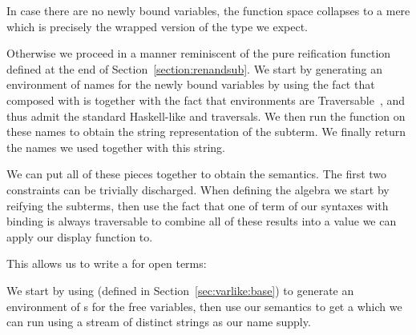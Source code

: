 \begin{agdasnippet}
\end{agdasnippet}

In case there are no newly bound variables, the  function space
collapses to a mere  which is precisely the wrapped version of
the type we expect.

\begin{agdasnippet}
\end{agdasnippet}

Otherwise we proceed in a manner reminiscent of the pure reification function
defined at the end of Section~\ref{section:renandsub}. We start by generating an environment
of names for the newly bound variables by using the fact that  composed
with  is  together with the fact that environments are
Traversable~\cite{mcbride_paterson_2008}, %
and thus admit the standard Haskell-like  and 
traversals. %
We then run the  function
on these names to obtain the string representation of the subterm. We finally
return the names we used together with this string.

\begin{agdasnippet}
\end{agdasnippet}

We can put all of these pieces together to obtain the  semantics.
The first two constraints can be trivially discharged. When defining the
algebra we start by reifying the subterms, then use the fact that  one 
of term of our syntaxes with binding is always traversable to combine all of
these results into a value we can apply our display function to.

\begin{agdasnippet}
\end{agdasnippet}

This allows us to write a  for open terms:

\begin{agdasnippet}
\end{agdasnippet}
We start by using  (defined in Section~\ref{sec:varlike:base})
to generate an environment of s for the free variables, then use
our semantics to get a  which we can run using a stream  of distinct
strings as our name supply.




